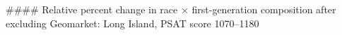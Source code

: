#### Relative percent change in race × first-generation composition after excluding Geomarket: Long Island, PSAT score 1070–1180
